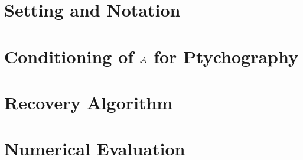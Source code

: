 \section{Setting and Notation}

\label{sec:ptych_intro}

\section{Conditioning of $\mathcal{A}$ for Ptychography}

\label{sec:con_number_ptych}

\section{Recovery Algorithm}

\label{sec:ptych_recov}
\label{sec:ptych_recovery}

\section{Numerical Evaluation}

\label{sec:ptych_num}
